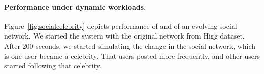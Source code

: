 



\paragraph*{Performance under dynamic workloads.}

Figure~\ref{fig:socialcelebrity} depicts performance of \dynastar and \ssmr of an evolving social network.  
We started the system with the original network from Higg dataset. After 200 seconds, we started simulating 
the change in the social network, which is one user became a celebrity. That users posted more frequently, and 
other users started following that celebrity. 

